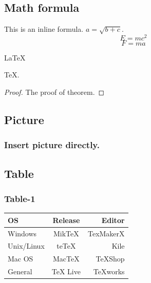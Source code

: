 \documentclass{mcmthesis}
\begin{document}
	\subsection{Math formula}
	This is an inline formula. $a = \sqrt{b + c}$.
	\begin{equation}
		E = mc^2
	\end{equation}
	\begin{equation}
		F = ma
	\end{equation}
	\begin{Theorem} \label{thm:latex}
		\LaTeX
	\end{Theorem}
	\begin{Lemma} \label{thm:tex}
		\TeX .
	\end{Lemma}
	\begin{proof}
		The proof of theorem.
	\end{proof}
	
	\subsection{Picture} 
	\subsubsection{Insert picture directly.}
	
	

	
	
	
	\subsection{Table}
	
	\subsubsection{Table-1}
	\begin{tabular}{|l|c|r|}
		\hline
		OS & Release & Editor\\
		\hline
		Windows & MikTeX & TexMakerX \\
		\hline
		Unix/Linux & teTeX & Kile \\
		\hline
		Mac OS & MacTeX & TeXShop \\
		\hline
		General & TeX Live & TeXworks \\
		\hline
	\end{tabular}
	
\end{document}
